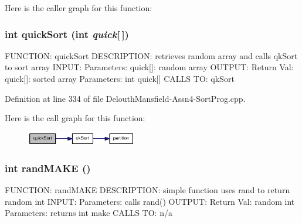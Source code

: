 Here is the caller graph for this function:

\hypertarget{_delouth_mansfield-_assn4-_sort_prog_8cpp_a9e940b0f849a62e9ff4319606269ae38}{
\subsubsection[{quickSort}]{\setlength{\rightskip}{0pt plus 5cm}int quickSort (int {\em quick}\mbox{[}$\,$\mbox{]})}}
\label{_delouth_mansfield-_assn4-_sort_prog_8cpp_a9e940b0f849a62e9ff4319606269ae38}
FUNCTION: quickSort DESCRIPTION: retrieves random array and calls qkSort to sort array INPUT: Parameters: quick\mbox{[}\mbox{]}: random array OUTPUT: Return Val: quick\mbox{[}\mbox{]}: sorted array Parameters: int quick\mbox{[}\mbox{]} CALLS TO: qkSort 

Definition at line 334 of file DelouthMansfield-\/Assn4-\/SortProg.cpp.



Here is the call graph for this function:\nopagebreak
\begin{figure}[H]
\begin{center}
\leavevmode
\includegraphics[width=136pt]{_delouth_mansfield-_assn4-_sort_prog_8cpp_a9e940b0f849a62e9ff4319606269ae38_cgraph}
\end{center}
\end{figure}


\hypertarget{_delouth_mansfield-_assn4-_sort_prog_8cpp_a191743d28b671610e8d78df14b41ed9e}{
\subsubsection[{randMAKE}]{\setlength{\rightskip}{0pt plus 5cm}int randMAKE ()}}
\label{_delouth_mansfield-_assn4-_sort_prog_8cpp_a191743d28b671610e8d78df14b41ed9e}
FUNCTION: randMAKE DESCRIPTION: simple function uses rand to return random int INPUT: Parameters: calls rand() OUTPUT: Return Val: random int Parameters: returns int make CALLS TO: n/a 

